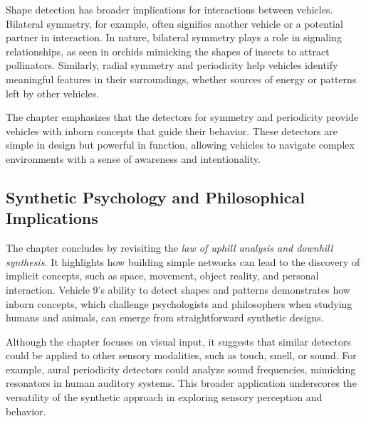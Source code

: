 \documentclass{article}
\begin{document}
	Shape detection has broader implications for interactions between vehicles. Bilateral symmetry, for example, often signifies another vehicle or a potential partner in interaction. In nature, bilateral symmetry plays a role in signaling relationships, as seen in orchids mimicking the shapes of insects to attract pollinators. Similarly, radial symmetry and periodicity help vehicles identify meaningful features in their surroundings, whether sources of energy or patterns left by other vehicles.  

	The chapter emphasizes that the detectors for symmetry and periodicity provide vehicles with inborn concepts that guide their behavior. These detectors are simple in design but powerful in function, allowing vehicles to navigate complex environments with a sense of awareness and intentionality.

	

	\subsection*{Synthetic Psychology and Philosophical Implications}

	The chapter concludes by revisiting the \textit{law of uphill analysis and downhill synthesis.} It highlights how building simple networks can lead to the discovery of implicit concepts, such as space, movement, object reality, and personal interaction. Vehicle 9's ability to detect shapes and patterns demonstrates how inborn concepts, which challenge psychologists and philosophers when studying humans and animals, can emerge from straightforward synthetic designs.  

	Although the chapter focuses on visual input, it suggests that similar detectors could be applied to other sensory modalities, such as touch, smell, or sound. For example, aural periodicity detectors could analyze sound frequencies, mimicking resonators in human auditory systems. This broader application underscores the versatility of the synthetic approach in exploring sensory perception and behavior. 
\end{document}
